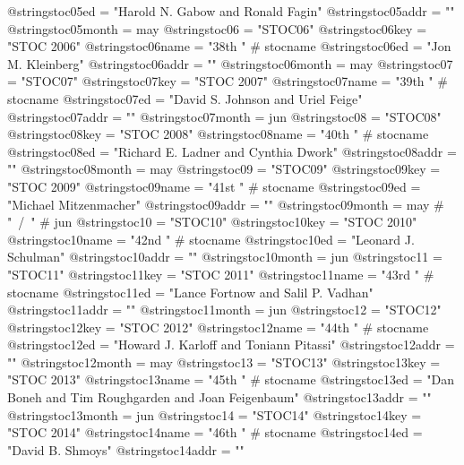 @string{stoc05ed =              "Harold N. Gabow and Ronald Fagin"}
@string{stoc05addr =            ""}
@string{stoc05month =           may}
@string{stoc06 =                "STOC06"}
@string{stoc06key =             "STOC 2006"}
@string{stoc06name =            "38th " # stocname}
@string{stoc06ed =              "Jon M. Kleinberg"}
@string{stoc06addr =            ""}
@string{stoc06month =           may}
@string{stoc07 =                "STOC07"}
@string{stoc07key =             "STOC 2007"}
@string{stoc07name =            "39th " # stocname}
@string{stoc07ed =              "David S. Johnson and Uriel Feige"}
@string{stoc07addr =            ""}
@string{stoc07month =           jun}
@string{stoc08 =                "STOC08"}
@string{stoc08key =             "STOC 2008"}
@string{stoc08name =            "40th " # stocname}
@string{stoc08ed =              "Richard E. Ladner and Cynthia Dwork"}
@string{stoc08addr =            ""}
@string{stoc08month =           may}
@string{stoc09 =                "STOC09"}
@string{stoc09key =             "STOC 2009"}
@string{stoc09name =            "41st " # stocname}
@string{stoc09ed =              "Michael Mitzenmacher"}
@string{stoc09addr =            ""}
@string{stoc09month =           may # "~/~" # jun}
@string{stoc10 =                "STOC10"}
@string{stoc10key =             "STOC 2010"}
@string{stoc10name =            "42nd " # stocname}
@string{stoc10ed =              "Leonard J. Schulman"}
@string{stoc10addr =            ""}
@string{stoc10month =           jun}
@string{stoc11 =                "STOC11"}
@string{stoc11key =             "STOC 2011"}
@string{stoc11name =            "43rd " # stocname}
@string{stoc11ed =              "Lance Fortnow and Salil P. Vadhan"}
@string{stoc11addr =            ""}
@string{stoc11month =           jun}
@string{stoc12 =                "STOC12"}
@string{stoc12key =             "STOC 2012"}
@string{stoc12name =            "44th " # stocname}
@string{stoc12ed =              "Howard J. Karloff and Toniann Pitassi"}
@string{stoc12addr =            ""}
@string{stoc12month =           may}
@string{stoc13 =                "STOC13"}
@string{stoc13key =             "STOC 2013"}
@string{stoc13name =            "45th " # stocname}
@string{stoc13ed =              "Dan Boneh and Tim Roughgarden and Joan Feigenbaum"}
@string{stoc13addr =            ""}
@string{stoc13month =           jun}
@string{stoc14 =                "STOC14"}
@string{stoc14key =             "STOC 2014"}
@string{stoc14name =            "46th " # stocname}
@string{stoc14ed =              "David B. Shmoys"}
@string{stoc14addr =            ""}
